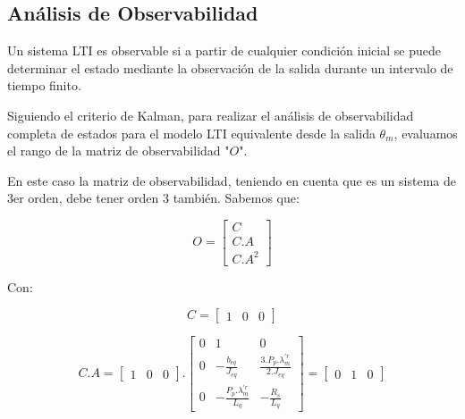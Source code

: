\documentclass{article}
\begin{document}

\subsection{Análisis de Observabilidad}

Un sistema LTI es observable si a partir de cualquier condición inicial se puede determinar el estado
mediante la observación de la salida durante un intervalo de tiempo finito.

Siguiendo el criterio de Kalman, 
para realizar el análisis de observabilidad completa de estados para el modelo LTI equivalente 
 desde la salida $\theta_m$, evaluamos el rango de la matriz de observabilidad "$O$".

En este caso la matriz de observabilidad, teniendo en cuenta que es un sistema de 3er orden, 
debe tener orden 3 también. Sabemos que:

\begin{equation}
    O = \begin{bmatrix}
        C \\
        C.A \\
        C.A^2
    \end{bmatrix}
\end{equation}

Con:

\begin{equation}
    C = \begin{bmatrix}
        1 & 0 & 0
    \end{bmatrix}
\end{equation}

\begin{equation}
    C.A = 
    \begin{bmatrix}
        1 & 0 & 0
    \end{bmatrix}.
    \begin{bmatrix}
        0 & 1 & 0 \\
        0 & -\frac{b_{eq}}{J_{eq}} & \frac{3.P_p.\lambda_m^{\prime r}}{2.J_{eq}} \\
        0 & -\frac{P_p.\lambda_m^{\prime r}}{L_q} & -\frac{R_s}{L_q}
    \end{bmatrix}
    =
    \begin{bmatrix}
        0 & 1 & 0
    \end{bmatrix}
\end{equation}
\end{document}
